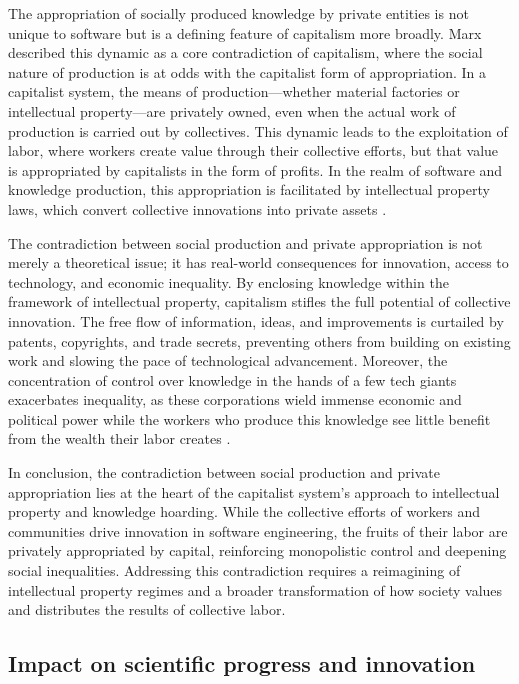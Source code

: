 The appropriation of socially produced knowledge by private entities is not unique to software but is a defining feature of capitalism more broadly. Marx described this dynamic as a core contradiction of capitalism, where the social nature of production is at odds with the capitalist form of appropriation. In a capitalist system, the means of production—whether material factories or intellectual property—are privately owned, even when the actual work of production is carried out by collectives. This dynamic leads to the exploitation of labor, where workers create value through their collective efforts, but that value is appropriated by capitalists in the form of profits. In the realm of software and knowledge production, this appropriation is facilitated by intellectual property laws, which convert collective innovations into private assets \cite[pp.~712-714]{marx1885}.

The contradiction between social production and private appropriation is not merely a theoretical issue; it has real-world consequences for innovation, access to technology, and economic inequality. By enclosing knowledge within the framework of intellectual property, capitalism stifles the full potential of collective innovation. The free flow of information, ideas, and improvements is curtailed by patents, copyrights, and trade secrets, preventing others from building on existing work and slowing the pace of technological advancement. Moreover, the concentration of control over knowledge in the hands of a few tech giants exacerbates inequality, as these corporations wield immense economic and political power while the workers who produce this knowledge see little benefit from the wealth their labor creates \cite[pp.~45-47]{harvey2014}.

In conclusion, the contradiction between social production and private appropriation lies at the heart of the capitalist system’s approach to intellectual property and knowledge hoarding. While the collective efforts of workers and communities drive innovation in software engineering, the fruits of their labor are privately appropriated by capital, reinforcing monopolistic control and deepening social inequalities. Addressing this contradiction requires a reimagining of intellectual property regimes and a broader transformation of how society values and distributes the results of collective labor.

\subsection{Impact on scientific progress and innovation}

